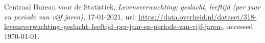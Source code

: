 \documentclass{article}
\begin{document}
\begin{thebibliography}	{}


 Centraal Bureau voor de Statistiek, \textit{Levensverwachting; geslacht, leeftijd (per jaar en periode van vijf jaren)}, 17-01-2021, url:
\href{https://data.overheid.nl/dataset/318-levensverwachting--geslacht--leeftijd--per-jaar-en-periode-van-vijf-jaren-}{https://data.overheid.nl/dataset/318-levensverwachting--geslacht--leeftijd--per-jaar-en-periode-van-vijf-jaren-}, accessed {\today}. 

\bibitem{}


\end{thebibliography}
\end{document}
